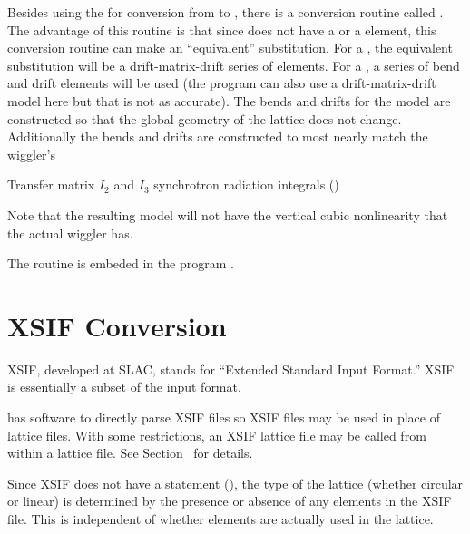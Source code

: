 Besides using the  for conversion
from \bmad to \mad, there is a \bmad conversion routine called
. 
The advantage of this routine is that since \mad does not have a
 or a  element, this conversion routine can
make an ``equivalent'' substitution. For a , the
equivalent substitution will be a drift-matrix-drift series of
elements. For a , a series of bend and drift elements will
be used (the program can also use a drift-matrix-drift model here but
that is not as accurate). The bends and drifts for the 
model are constructed so that the global geometry of the lattice does
not change. Additionally the bends and drifts are constructed to most
nearly match the wiggler's
\begin{example}
  Transfer matrix
  $I_2$ and $I_3$ synchrotron radiation integrals ()
\end{example}
Note that the resulting model will not have the vertical cubic
nonlinearity that the actual wiggler has.

The  routine is embeded in the program
.

\section{XSIF Conversion}
\label{s:xsif.convert}

XSIF\cite{b:xsif}, developed at SLAC, stands for ``Extended Standard
Input Format.''  XSIF is essentially a subset of the
\mad\cite{b:maduser} input format.

\bmad has software to directly parse XSIF files so XSIF files may be
used in place of \bmad lattice files.  With some restrictions, an XSIF
lattice file may be called from within a \bmad lattice file. See
Section~ for details.

Since XSIF does not have a  statement
(), the type of the lattice (whether circular or linear)
is determined by the presence or absence of any  elements
in the XSIF file. This is independent of whether  elements
are actually used in the lattice.

